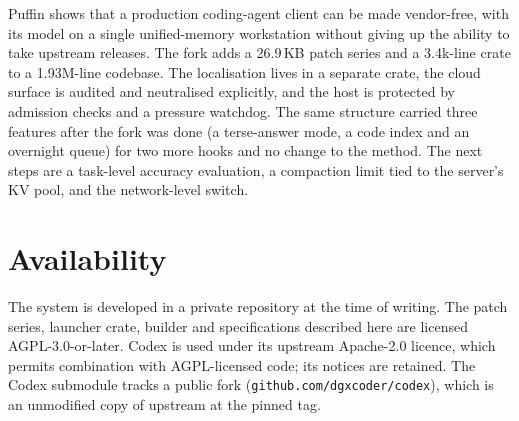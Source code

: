 \documentclass[11pt]{article}
\newcommand{\code}[1]{\texttt{#1}}
\begin{document}
Puffin shows that a production coding-agent client can be made vendor-free, with its model on a single
unified-memory workstation without giving up the ability to take upstream releases. The fork adds
a 26.9\,KB patch series and a 3.4k-line crate to a 1.93M-line codebase. The localisation lives in a separate crate, the cloud
surface is audited and neutralised explicitly, and the host is protected by admission checks and a
pressure watchdog. The same structure carried three features after the fork was done (a
terse-answer mode, a code index and an overnight queue) for two more hooks and no change to the
method. The next steps are a task-level accuracy evaluation, a compaction limit tied to the
server's KV pool, and the network-level switch.

\section*{Availability}
The system is developed in a private repository at the time of writing. The patch series, launcher
crate, builder and specifications described here are licensed AGPL-3.0-or-later. Codex is used
under its upstream Apache-2.0 licence, which permits combination with AGPL-licensed code; its
notices are retained. The Codex submodule tracks a public fork (\code{github.com/dgxcoder/codex}),
which is an unmodified copy of upstream at the pinned tag.



\end{document}

